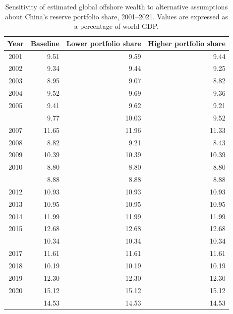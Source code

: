 \begin{table}

\caption{\label{tab:tab:sensitivity_china_offshore}Sensitivity of estimated global offshore wealth to alternative assumptions about China's reserve portfolio share, 2001--2021. Values are expressed as a percentage of world GDP.}
\centering
\begin{tabular}[t]{crrr}
\toprule
Year & Baseline & Lower portfolio share & Higher portfolio share\\
\midrule
2001 & 9.51 & 9.59 & 9.44\\
2002 & 9.34 & 9.44 & 9.25\\
2003 & 8.95 & 9.07 & 8.82\\
2004 & 9.52 & 9.69 & 9.36\\
2005 & 9.41 & 9.62 & 9.21\\
\addlinespace
2006 & 9.77 & 10.03 & 9.52\\
2007 & 11.65 & 11.96 & 11.33\\
2008 & 8.82 & 9.21 & 8.43\\
2009 & 10.39 & 10.39 & 10.39\\
2010 & 8.80 & 8.80 & 8.80\\
\addlinespace
2011 & 8.88 & 8.88 & 8.88\\
2012 & 10.93 & 10.93 & 10.93\\
2013 & 10.95 & 10.95 & 10.95\\
2014 & 11.99 & 11.99 & 11.99\\
2015 & 12.68 & 12.68 & 12.68\\
\addlinespace
2016 & 10.34 & 10.34 & 10.34\\
2017 & 11.61 & 11.61 & 11.61\\
2018 & 10.19 & 10.19 & 10.19\\
2019 & 12.30 & 12.30 & 12.30\\
2020 & 15.12 & 15.12 & 15.12\\
\addlinespace
2021 & 14.53 & 14.53 & 14.53\\
\bottomrule
\end{tabular}
\end{table}
